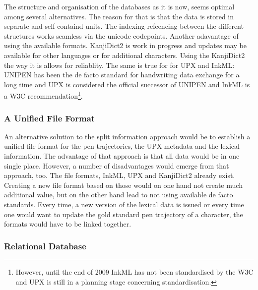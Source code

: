 The structure and organisation of the databases as it is now, seems optimal
among several alternatives. The reason for that is that the data is stored in
separate and self-containd units. The indexing refeencing between the different
structures works seamless via the unicode codepoints.
Another adavantage of using the available formats. KanjiDict2 is work in
progress and updates may be available for other languages or for additional 
characters. Using the KanjiDict2 the way it is allows for reliablity.
The same is true for for UPX and InkML: UNIPEN has been the de facto standard
for handwriting data exchange for a long time and UPX is considered the
official successor of UNIPEN and InkML is a W3C recommendation\footnote{
However, until the end of 2009 InkML has not been standardised by the W3C and
UPX is still in a planning stage concerning standardisation.}.

\subsubsection{A Unified File Format}
\label{sec:hwre:aunifiedfileformat}

An alternative solution to the split information approach would be to
establish a unified file format for the pen trajectories, the UPX metadata
and the lexical information. 
The advantage of that approach is that all data would be in one single 
place. However, a number of disadvantages would emerge from that approach, too.
The file formats, InkML, UPX and KanjiDict2 already exist.
Creating a new file format based on those would on one hand not create much 
additional value, but on the other hand lead to not using available de facto
standards. Every time, a new version of the lexical data is issued or every
time one would want to update the gold standard pen trajectory of a character,
the formats would have to be linked together. 

\subsubsection{Relational Database}
\label{sec:hwre:relationaldatabase}

